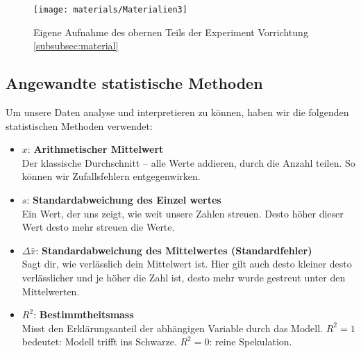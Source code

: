 \documentclass[../main.tex]{subfiles} %
\begin{document}
            \begin{figure}[H]
                \centering
                \texttt{[image: materials/Materialien3]}
                \caption{Eigene Aufnahme des obernen Teils der Experiment Vorrichtung  \ref{subsubsec:material}}
                \label{fig:material3}
            \end{figure}

    \subsection{Angewandte statistische Methoden}\label{subsec:angewandte-statistische-methoden}
        Um unsere Daten analyse und interpretieren zu können, haben wir die folgenden statistischen Methoden verwendet:
        \begin{itemize}
            \item $x$: \textbf{Arithmetischer Mittelwert} \\
            \quad Der klassische Durchschnitt – alle Werte addieren, durch die Anzahl teilen.
                  So können wir Zufallsfehlern entgegenwirken.

            \item $s$: \textbf{Standardabweichung des Einzel    wertes} \\
            \quad Ein Wert, der uns zeigt, wie weit unsere Zahlen streuen.
                  Desto höher dieser Wert desto mehr streuen die Werte.

            \item $\Delta \bar{x}$: \textbf{Standardabweichung des Mittelwertes (Standardfehler)} \\
            \quad Sagt dir, wie verlässlich dein Mittelwert ist.
                  Hier gilt auch desto kleiner desto verlässlicher und je höher die Zahl ist, desto mehr wurde gestreut unter den Mittelwerten.

            \item $R^2$: \textbf{Bestimmtheitsmass} \\
            \quad Misst den Erklärungsanteil der abhängigen Variable durch das Modell. $R^2 = 1$ bedeutet: Modell trifft ins Schwarze. $R^2 = 0$: reine Spekulation.
        \end{itemize}
\end{document}
